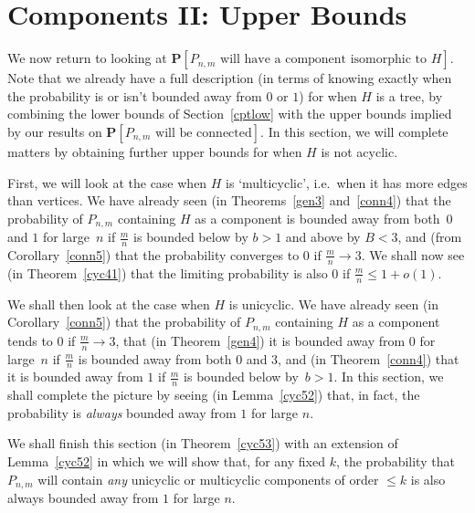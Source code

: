 \documentclass{article}
\newtheorem{Proof of Theorem}{Proof of Theorem}
\begin{document}
\newpage
\section{Components II: Upper Bounds} \label{cyccpt}















We now return to looking at 
$\mathbf{P}[P_{n,m} \textrm{ will have a component isomorphic to } H]$. 
Note that we already have a full description
(in terms of knowing exactly when the probability is or isn't bounded away from $0$ or $1$)
for when $H$ is a tree,
by combining the lower bounds of Section~\ref{cptlow} 
with the upper bounds implied by our results on 
$\mathbf{P}[P_{n,m} \textrm{ will be connected}]$.
In this section,
we will complete matters by obtaining further upper bounds for when $H$ is not acyclic.

First, we will look at the case when $H$ is `multicyclic',
i.e.~when it has more edges than vertices.
We have already seen (in Theorems~\ref{gen3} and~\ref{conn4}) 
that the probability of $P_{n,m}$ containing $H$ as a component is bounded away from both~$0$ and $1$
for large~$n$
if $\frac{m}{n}$ is bounded below by $b > 1$ and above by $B < 3$,
and (from Corollary~\ref{conn5}) that the probability converges to $0$ if $\frac{m}{n} \to 3$.
We shall now see (in Theorem~\ref{cyc41}) that the limiting probability is also $0$ if $\frac{m}{n} \leq 1+o(1)$. 

We shall then look at the case when $H$ is unicyclic.
We have already seen (in Corollary~\ref{conn5}) 
that the probability of $P_{n,m}$ containing $H$ as a component tends to $0$ if $\frac{m}{n} \to 3$,
that (in Theorem~\ref{gen4}) it is bounded away from $0$ for large~$n$
if $\frac{m}{n}$ is bounded away from both $0$ and $3$,
and (in Theorem~\ref{conn4}) 
that it is bounded away from $1$ if $\frac{m}{n}$ is bounded below by~$b>1$.
In this section,
we shall complete the picture by seeing (in Lemma~\ref{cyc52}) that, in fact, 
the probability is \textit{always} bounded away from $1$ for large $n$. 

We shall finish this section (in Theorem~\ref{cyc53}) with an extension of Lemma~\ref{cyc52}
in which we will show that, for any fixed $k$,
the probability that 
$P_{n,m}$ will contain \textit{any} unicyclic or multicyclic components of order $\leq k$ 
is also always bounded away from $1$ for large $n$. 
\end{document}

